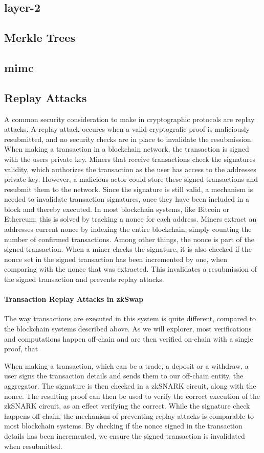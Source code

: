 \documentclass[../../thesis.tex]{subfiles}
\begin{document}
\subsection{layer-2}
\subsection{Merkle Trees}
\subsection{mimc}
\subsection{Replay Attacks}
A common security consideration to make in cryptographic protocols are replay attacks. A replay attack occures when a valid cryptografic proof is maliciously resubmitted, and no security checks are in place to invalidate the resubmission. When making a transaction in a blockchain network, the transaction is signed with the users private key. Miners that receive transactions check the signatures validity, which authorizes the transaction as the user has access to the addresses private key. However, a malicious actor could store these signed transactions and resubmit them to the network. Since the signature is still valid, a mechanism is needed to invalidate transaction signatures, once they have been included in a block and thereby executed. In most blockchain systems, like Bitcoin or Ethereum, this is solved by tracking a nonce for each address. Miners extract an addresses current nonce by indexing the entire blockchain, simply counting the number of confirmed transactions. Among other things, the nonce is part of the signed transaction. When a miner checks the signature, it is also checked if the nonce set in the signed transaction has been incremented by one, when comparing with the nonce that was extracted. This invalidates a resubmission of the signed transaction and prevents replay attacks. 

\paragraph{Transaction Replay Attacks in zkSwap}
The way transactions are executed in this system is quite different, compared to the blockchain systems described above. As we will explorer, most verifications and computations happen off-chain and are then verified on-chain with a single proof, that

When making a transaction, which can be a trade, a deposit or a withdraw, a user signs the transaction details and sends them to our off-chain entity, the aggregator. The signature is then checked in a zkSNARK circuit, along with the nonce. The resulting proof can then be used to verify the correct execution of the zkSNARK circuit, as an effect verifying the correct. While the signature check happens off-chain, the mechanism of preventing replay attacks is comparable to most blockchain systems. By checking if the nonce signed in the transaction details has been incremented, we ensure the signed transaction is invalidated when resubmitted. 
\end{document}
